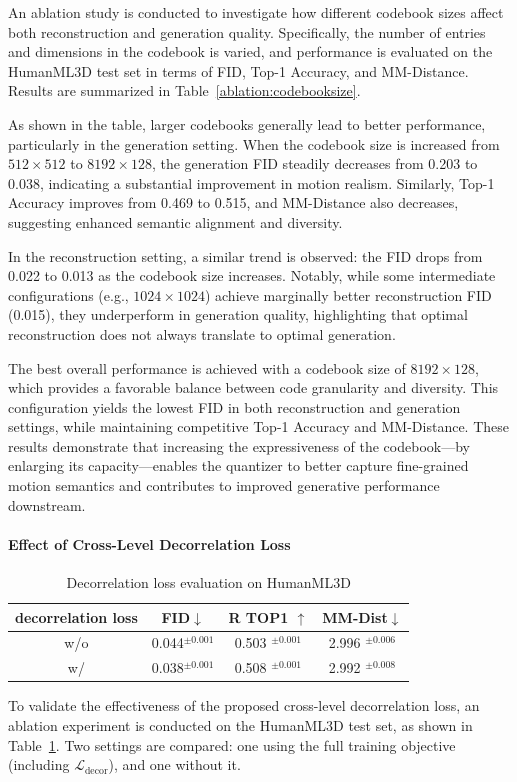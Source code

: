 \documentclass[a4paper,12pt]{article}
\begin{document}
An ablation study is conducted to investigate how different codebook sizes affect both reconstruction and generation quality. Specifically, the number of entries and dimensions in the codebook is varied, and performance is evaluated on the HumanML3D test set in terms of FID, Top-1 Accuracy, and MM-Distance. Results are summarized in Table~\ref{ablation:codebooksize}.

As shown in the table, larger codebooks generally lead to better performance, particularly in the generation setting. When the codebook size is increased from $512 \times 512$ to $8192 \times 128$, the generation FID steadily decreases from 0.203 to 0.038, indicating a substantial improvement in motion realism. Similarly, Top-1 Accuracy improves from 0.469 to 0.515, and MM-Distance also decreases, suggesting enhanced semantic alignment and diversity.

In the reconstruction setting, a similar trend is observed: the FID drops from 0.022 to 0.013 as the codebook size increases. Notably, while some intermediate configurations (e.g., $1024 \times 1024$) achieve marginally better reconstruction FID (0.015), they underperform in generation quality, highlighting that optimal reconstruction does not always translate to optimal generation.

The best overall performance is achieved with a codebook size of $8192 \times 128$, which provides a favorable balance between code granularity and diversity. This configuration yields the lowest FID in both reconstruction and generation settings, while maintaining competitive Top-1 Accuracy and MM-Distance. These results demonstrate that increasing the expressiveness of the codebook—by enlarging its capacity—enables the quantizer to better capture fine-grained motion semantics and contributes to improved generative performance downstream.


\paragraph{Effect of Cross-Level Decorrelation Loss}
\begin{table}[t]
\centering
\footnotesize
\setlength{\tabcolsep}{10pt}
\renewcommand{\arraystretch}{1.2}

\begin{tabular}{cccc}
\toprule
\textbf{decorrelation loss} & \textbf{FID}$\downarrow$& \textbf{R TOP1 $\uparrow$} & MM-Dist$\downarrow$\\
\midrule
w/o & 0.044$^{\pm 0.001}$ & 0.503 $^{\pm 0.001}$ & 2.996 $^{\pm 0.006}$\\
w/ & 0.038$^{\pm 0.001}$  & 0.508 $^{\pm 0.001}$& 2.992 $^{\pm 0.008}$\\
\bottomrule
\end{tabular}
\caption{Decorrelation loss evaluation on HumanML3D}
\label{tab:compare_vae_kitml}
\end{table}
To validate the effectiveness of the proposed cross-level decorrelation loss, an ablation experiment is conducted on the HumanML3D test set, as shown in Table~\ref{tab:compare_vae_kitml}. Two settings are compared: one using the full training objective (including $\mathcal{L}_{\text{decor}}$), and one without it.
\end{document}

